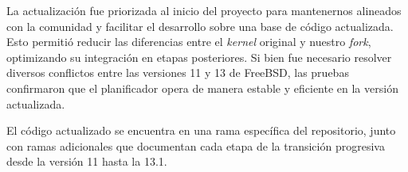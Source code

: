 La actualización fue priorizada al inicio del proyecto para mantenernos alineados con la comunidad y facilitar el desarrollo sobre una base de código actualizada. Esto permitió reducir las diferencias entre el \textit{kernel} original y nuestro \textit{fork}, optimizando su integración en etapas posteriores. Si bien fue necesario resolver diversos conflictos entre las versiones 11 y 13 de FreeBSD, las pruebas confirmaron que el planificador opera de manera estable y eficiente en la versión actualizada.\par

El código actualizado se encuentra en una rama específica del repositorio, junto con ramas adicionales que documentan cada etapa de la transición progresiva desde la versión 11 hasta la 13.1.\par





